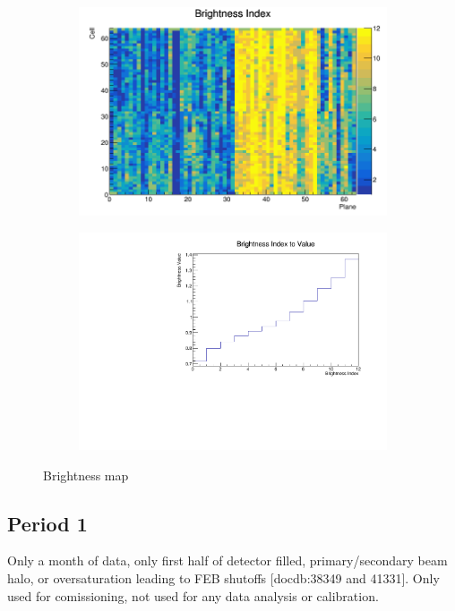 \documentclass[12pt,a4paper]{article}
\begin{document}
\begin{figure}[hbtp]
\centering
\begin{subfigure}[b]{0.495\textwidth}
\centering
\includegraphics[width=\textwidth]{Plots/BrightnessIndex.png}
\end{subfigure}
\begin{subfigure}[b]{0.495\textwidth}
\centering
\includegraphics[width=\textwidth]{Plots/BrightnessIndexToValue.pdf}
\end{subfigure}
\caption{Brightness map}
\end{figure}



\subsection{Period 1}
Only a month of data, only first half of detector filled, primary/secondary beam halo, or oversaturation leading to FEB shutoffs [docdb:38349 and 41331].
Only used for comissioning, not used for any data analysis or calibration.
\end{document}
